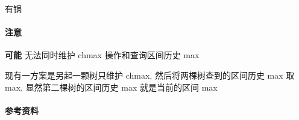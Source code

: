 有锅

\paragraph{注意} \textbf{可能} 无法同时维护 chmax 操作和查询区间历史 max

现有一方案是另起一颗树只维护 chmax, 然后将两棵树查到的区间历史 max 取 max, 显然第二棵树的区间历史 max 就是当前的区间 max

\paragraph{参考资料} \cite{ruyi2016segbeats}